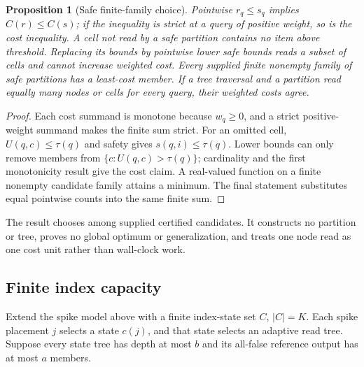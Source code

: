 \documentclass[11pt]{article}
\numberwithin{equation}{section}
\newtheorem{proposition}{Proposition}
\begin{document}
\begin{proposition}[Safe finite-family choice]\label{prop:app-weighted-partition}
Pointwise $r_q\le s_q$ implies $C(r)\le C(s)$; if the inequality is strict at a query of positive weight,
so is the cost inequality. A cell not read by a safe partition contains no item above threshold. Replacing
its bounds by pointwise lower safe bounds reads a subset of cells and cannot increase weighted cost. Every
supplied finite nonempty family of safe partitions has a least-cost member. If a tree traversal and a
partition read equally many nodes or cells for every query, their weighted costs agree.
\end{proposition}
\begin{proof}
Each cost summand is monotone because $w_q\ge0$, and a strict positive-weight summand makes the finite sum
strict. For an omitted cell, $U(q,c)\le\tau(q)$ and safety gives $s(q,i)\le\tau(q)$. Lower bounds can only
remove members from $\{c:U(q,c)>\tau(q)\}$; cardinality and the first monotonicity result give the cost claim.
A real-valued function on a finite nonempty candidate family attains a minimum. The final statement
substitutes equal pointwise counts into the same finite sum.
\end{proof}

The result chooses among supplied certified candidates. It constructs no partition or tree, proves no global
optimum or generalization, and treats one node read as one cost unit rather than wall-clock work.

\subsection{Finite index capacity}

Extend the spike model above with a finite index-state set $C$, $|C|=K$. Each spike placement $j$ selects a
state $c(j)$, and that state selects an adaptive read tree. Suppose every state tree has depth at most $b$
and its all-false reference output has at most $a$ members.
\end{document}
